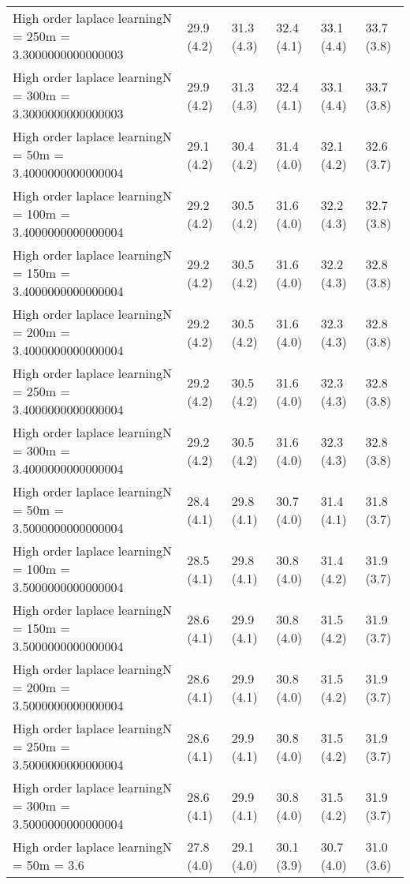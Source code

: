 \documentclass{article}
\begin{document}
\begin{table*}[t!]
\begin{center}
\begin{small}
\begin{sc}
\begin{tabular}{llllll}
High order laplace learningN = 250m = 3.3000000000000003&29.9 (4.2)      &31.3 (4.3)      &32.4 (4.1)      &33.1 (4.4)      &33.7 (3.8)      \\
High order laplace learningN = 300m = 3.3000000000000003&29.9 (4.2)      &31.3 (4.3)      &32.4 (4.1)      &33.1 (4.4)      &33.7 (3.8)      \\
High order laplace learningN = 50m = 3.4000000000000004&29.1 (4.2)      &30.4 (4.2)      &31.4 (4.0)      &32.1 (4.2)      &32.6 (3.7)      \\
High order laplace learningN = 100m = 3.4000000000000004&29.2 (4.2)      &30.5 (4.2)      &31.6 (4.0)      &32.2 (4.3)      &32.7 (3.8)      \\
High order laplace learningN = 150m = 3.4000000000000004&29.2 (4.2)      &30.5 (4.2)      &31.6 (4.0)      &32.2 (4.3)      &32.8 (3.8)      \\
High order laplace learningN = 200m = 3.4000000000000004&29.2 (4.2)      &30.5 (4.2)      &31.6 (4.0)      &32.3 (4.3)      &32.8 (3.8)      \\
High order laplace learningN = 250m = 3.4000000000000004&29.2 (4.2)      &30.5 (4.2)      &31.6 (4.0)      &32.3 (4.3)      &32.8 (3.8)      \\
High order laplace learningN = 300m = 3.4000000000000004&29.2 (4.2)      &30.5 (4.2)      &31.6 (4.0)      &32.3 (4.3)      &32.8 (3.8)      \\
High order laplace learningN = 50m = 3.5000000000000004&28.4 (4.1)      &29.8 (4.1)      &30.7 (4.0)      &31.4 (4.1)      &31.8 (3.7)      \\
High order laplace learningN = 100m = 3.5000000000000004&28.5 (4.1)      &29.8 (4.1)      &30.8 (4.0)      &31.4 (4.2)      &31.9 (3.7)      \\
High order laplace learningN = 150m = 3.5000000000000004&28.6 (4.1)      &29.9 (4.1)      &30.8 (4.0)      &31.5 (4.2)      &31.9 (3.7)      \\
High order laplace learningN = 200m = 3.5000000000000004&28.6 (4.1)      &29.9 (4.1)      &30.8 (4.0)      &31.5 (4.2)      &31.9 (3.7)      \\
High order laplace learningN = 250m = 3.5000000000000004&28.6 (4.1)      &29.9 (4.1)      &30.8 (4.0)      &31.5 (4.2)      &31.9 (3.7)      \\
High order laplace learningN = 300m = 3.5000000000000004&28.6 (4.1)      &29.9 (4.1)      &30.8 (4.0)      &31.5 (4.2)      &31.9 (3.7)      \\
High order laplace learningN = 50m = 3.6&27.8 (4.0)      &29.1 (4.0)      &30.1 (3.9)      &30.7 (4.0)      &31.0 (3.6)      \\

\end{tabular}
\end{sc}
\end{small}
\end{center}
\end{table*}
\end{document}
